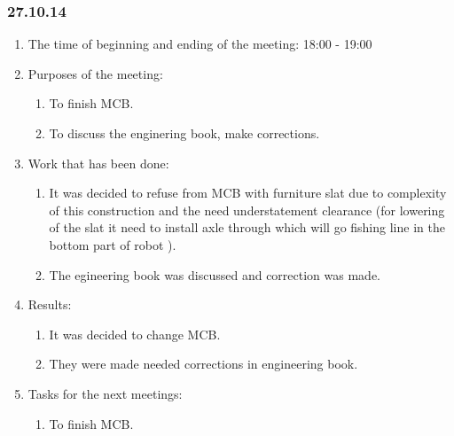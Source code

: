 	
\subsubsection{27.10.14}

\begin{enumerate}
	\item The time of beginning and ending of the meeting:
	18:00 - 19:00
	\item Purposes of the meeting:
	\begin{enumerate}
	  \item To finish MCB.
	  
	  \item To discuss the enginering book, make corrections.
	  
    \end{enumerate}
    
	\item Work that has been done:
	\begin{enumerate}
	  \item It was decided to refuse from MCB with furniture slat due to complexity of this construction and the need understatement clearance (for lowering of the slat it need to install axle through which will go fishing line in the bottom part of robot ).
      
      \item The egineering book was discussed and correction was made.
      
    \end{enumerate}
    
	\item Results:
	\begin{enumerate}
	  \item It was decided to change MCB.
	  
	  \item They were made needed corrections in engineering book.
      
    \end{enumerate}
    
	\item Tasks for the next meetings:
	\begin{enumerate}
	  \item To finish MCB.
	  
    \end{enumerate}     
\end{enumerate}
\fillpage
